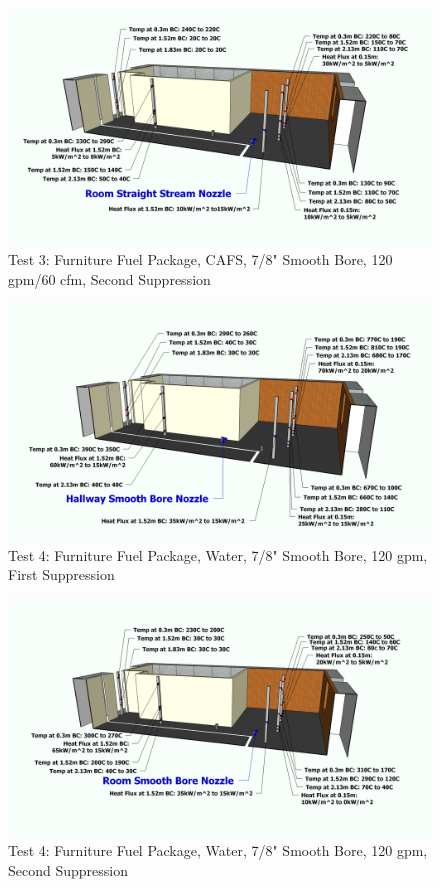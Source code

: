 \documentclass[12pt,oneside]{book}
\begin{document}
\begin{figure}[!ht]
	\includegraphics[width=6in]{../Figures/Pictures/Metric/DelCoSSTest3SecondSuppression}
	\caption{Test 3: Furniture Fuel Package, CAFS, 7/8" Smooth Bore, 120 gpm/60 cfm, Second Suppression}
	\label{fig:Test_3_Second_Suppression}
\end{figure}

\begin{figure}[!ht]
	\includegraphics[width=6in]{../Figures/Pictures/Metric/DelCoSSTest4FirstSuppression}
	\caption{Test 4: Furniture Fuel Package, Water, 7/8" Smooth Bore, 120 gpm, First Suppression}
	\label{fig:Test_4_First_Suppression}
\end{figure}

\begin{figure}[!ht]
	\includegraphics[width=6in]{../Figures/Pictures/Metric/DelCoSSTest4SecondSuppression}
	\caption{Test 4: Furniture Fuel Package, Water, 7/8" Smooth Bore, 120 gpm, Second Suppression}
	\label{fig:Test_4_Second_Suppression}
\end{figure}
\end{document}
